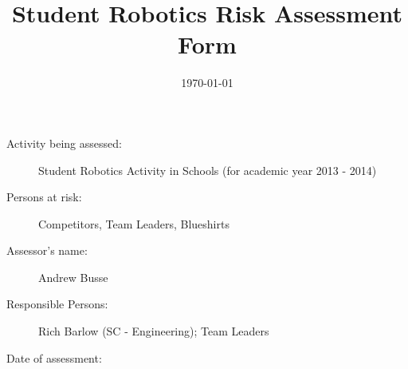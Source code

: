 \documentclass[12pt,a4paper]{scrartcl}
\title{Student Robotics Risk Assessment Form}
\begin{document}
\maketitle

\begin{description}
\item[Activity being assessed:] Student Robotics Activity in Schools (for
academic year 2013 - 2014)
\item[Persons at risk:] Competitors, Team Leaders, Blueshirts
\end{description}

\begin{description}
\item[Assessor's name:] Andrew Busse
\item[Responsible Persons:] Rich Barlow (SC - Engineering); Team Leaders
\item[Date of assessment:] \date{\today}
\end{description}
\clearpage

\newcommand{\risk}[4]{
 #1 & #2 & #3 & #4 \\
}
\end{document}
